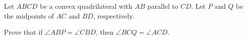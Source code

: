\documentclass[varwidth]{standalone}
\begin{document}
    Let $ABCD$ be a convex quadrilateral with $AB$ parallel to $CD$. Let $P$ and $Q$ be the midpoints of $AC$ and $BD$, respectively.

    Prove that if $\angle ABP = \angle CBD$, then $\angle BCQ = \angle ACD$.
\end{document}
